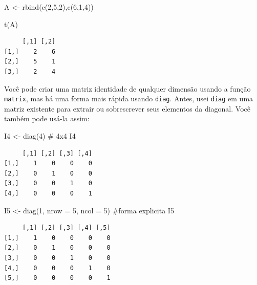 \documentclass[
  letterpaper,
  DIV=11,
  numbers=noendperiod]{scrreprt}
\newenvironment{Shaded}{\begin{snugshade}}{\end{snugshade}}
\newcommand{\AttributeTok}[1]{\textcolor[rgb]{0.40,0.45,0.13}{#1}}
\newcommand{\CommentTok}[1]{\textcolor[rgb]{0.37,0.37,0.37}{#1}}
\newcommand{\DecValTok}[1]{\textcolor[rgb]{0.68,0.00,0.00}{#1}}
\newcommand{\FunctionTok}[1]{\textcolor[rgb]{0.28,0.35,0.67}{#1}}
\newcommand{\NormalTok}[1]{\textcolor[rgb]{0.00,0.23,0.31}{#1}}
\newcommand{\OtherTok}[1]{\textcolor[rgb]{0.00,0.23,0.31}{#1}}
\begin{document}
\begin{Shaded}
\begin{Highlighting}[]
\NormalTok{A }\OtherTok{\textless{}{-}} \FunctionTok{rbind}\NormalTok{(}\FunctionTok{c}\NormalTok{(}\DecValTok{2}\NormalTok{,}\DecValTok{5}\NormalTok{,}\DecValTok{2}\NormalTok{),}\FunctionTok{c}\NormalTok{(}\DecValTok{6}\NormalTok{,}\DecValTok{1}\NormalTok{,}\DecValTok{4}\NormalTok{))}

\FunctionTok{t}\NormalTok{(A)}
\end{Highlighting}
\end{Shaded}

\begin{verbatim}
     [,1] [,2]
[1,]    2    6
[2,]    5    1
[3,]    2    4
\end{verbatim}

Você pode criar uma matriz identidade de qualquer dimensão usando a
função \texttt{matrix}, mas há uma forma mais rápida usando
\texttt{diag}. Antes, usei \texttt{diag} em uma matriz existente para
extrair ou sobrescrever seus elementos da diagonal. Você também pode
usá-la assim:

\begin{Shaded}
\begin{Highlighting}[]
\NormalTok{I4 }\OtherTok{\textless{}{-}} \FunctionTok{diag}\NormalTok{(}\DecValTok{4}\NormalTok{) }\CommentTok{\# 4x4}
\NormalTok{I4}
\end{Highlighting}
\end{Shaded}

\begin{verbatim}
     [,1] [,2] [,3] [,4]
[1,]    1    0    0    0
[2,]    0    1    0    0
[3,]    0    0    1    0
[4,]    0    0    0    1
\end{verbatim}

\begin{Shaded}
\begin{Highlighting}[]
\NormalTok{I5 }\OtherTok{\textless{}{-}} \FunctionTok{diag}\NormalTok{(}\DecValTok{1}\NormalTok{, }\AttributeTok{nrow =} \DecValTok{5}\NormalTok{, }\AttributeTok{ncol =} \DecValTok{5}\NormalTok{) }\CommentTok{\#forma explicita}
\NormalTok{I5}
\end{Highlighting}
\end{Shaded}

\begin{verbatim}
     [,1] [,2] [,3] [,4] [,5]
[1,]    1    0    0    0    0
[2,]    0    1    0    0    0
[3,]    0    0    1    0    0
[4,]    0    0    0    1    0
[5,]    0    0    0    0    1
\end{verbatim}
\end{document}
